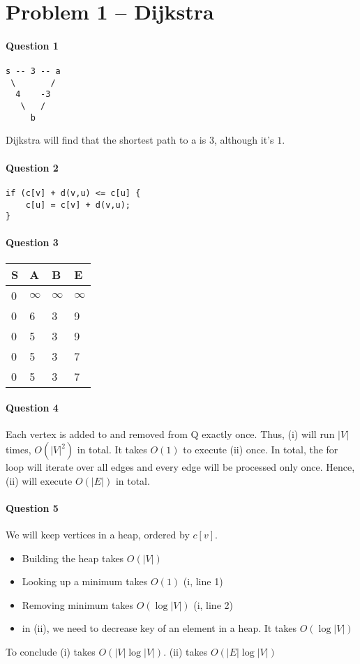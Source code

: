 \section{Problem 1 – Dijkstra}

\paragraph{Question 1}
\begin{verbatim}
s -- 3 -- a
 \       /
  4    -3
   \   /
     b
\end{verbatim}
Dijkstra will find that the shortest path to a is $3$, although it's $1$.

\paragraph{Question 2}
\begin{verbatim}
if (c[v] + d(v,u) <= c[u] {
    c[u] = c[v] + d(v,u);
}
\end{verbatim}

\paragraph{Question 3}

\begin{tabular}{llll}
S & A     & B     & E     \\
\hline
0 & $\infty$ & $\infty$ & $\infty$ \\
0 & 6     & 3     & 9     \\
0 & 5     & 3     & 9     \\
0 & 5     & 3     & 7     \\
0 & 5     & 3     & 7    
\end{tabular}


\paragraph{Question 4}
Each vertex is added to and removed from Q exactly once.
Thus, (i) will run $|V|$ times, $O(|V|^2)$ in total.
It takes $O(1)$ to execute (ii) once.
In total, the for loop will iterate over all edges and every edge will be processed only once.
Hence, (ii) will execute $O(|E|)$ in total.


\paragraph{Question 5}
We will keep vertices in a heap, ordered by $c[v]$.
\begin{itemize}
    \item Building the heap takes $O(|V|)$
    \item Looking up a minimum takes $O(1)$ (i, line 1)
    \item Removing minimum takes  $O(\log|V|)$ (i, line 2)
    \item in (ii), we need to decrease key of an element in a heap. It takes $O(\log|V|)$
\end{itemize}
To conclude (i) takes  $O(|V|\log|V|)$. 
(ii) takes $O(|E|\log|V|)$



